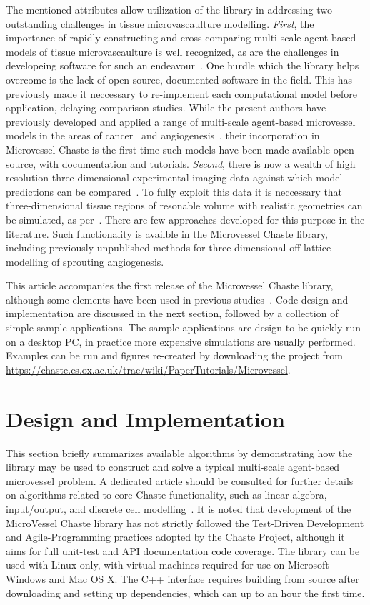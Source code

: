 \documentclass[10pt,letterpaper]{article}
\begin{document}
The mentioned attributes allow utilization of the library in addressing two outstanding challenges in tissue microvascaulture modelling. \emph{First}, the importance of rapidly constructing and cross-comparing multi-scale agent-based models of tissue microvascaulture is well recognized, as are the challenges in developeing software for such an endeavour~\cite{Rieger2015, Connor2012}. One hurdle which the library helps overcome is the lack of open-source, documented software in the field. This has previously made it neccessary to re-implement each computational model before application, delaying comparison studies. While the present authors have previously developed and applied a range of multi-scale agent-based microvessel models in the areas of cancer~\cite{Alarcon2005, Perfahl2011} and angiogenesis~\cite{Connor2015}, their incorporation in Microvessel Chaste is the first time such models have been made available open-source, with documentation and tutorials. \emph{Second}, there is now a wealth of high resolution three-dimensional experimental imaging data against which model predictions can be compared~\cite{Tozer2004}. To fully exploit this data it is neccessary that three-dimensional tissue regions of resonable volume with realistic geometries can be simulated, as per~\cite{Grogan2016}. There are few approaches developed for this purpose in the literature. Such functionality is availble in the Microvessel Chaste library, including previously unpublished methods for three-dimensional off-lattice modelling of sprouting angiogenesis.  

This article accompanies the first release of the Microvessel Chaste library, although some elements have been used in previous studies~\cite{Connor2015, Grogan2016}. Code design and implementation are discussed in the next section, followed by a collection of simple sample applications. The sample applications are design to be quickly run on a desktop PC, in practice more expensive simulations are usually performed. Examples can be run and figures re-created by downloading the project from \url{https://chaste.cs.ox.ac.uk/trac/wiki/PaperTutorials/Microvessel}. 

\section*{Design and Implementation}

This section briefly summarizes available algorithms by demonstrating how the library may be used to construct and solve a typical multi-scale agent-based microvessel problem. A dedicated article should be consulted for further details on algorithms related to core Chaste functionality, such as linear algebra, input/output, and discrete cell modelling~\cite{Mirams2013}. It is noted that development of the MicroVessel Chaste library has not strictly followed the Test-Driven Development and Agile-Programming practices adopted by the Chaste Project, although it aims for full unit-test and API documentation code coverage. The library can be used with Linux only, with virtual machines required for use on Microsoft Windows and Mac OS X. The C++ interface requires building from source after downloading and setting up dependencies, which can up to an hour the first time.
\end{document}
